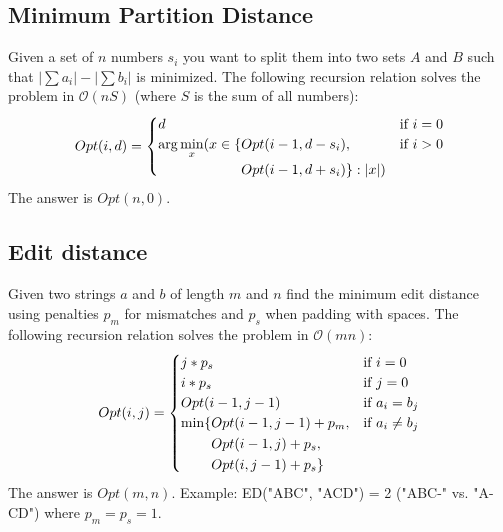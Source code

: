 \documentclass[8pt,a4paper,landscape,oneside]{amsart}
\newcommand{\bigO}{\mathcal{O}}
\begin{document}
\begin{multicols*}{3}
  \subsection{Minimum Partition Distance}
  Given a set of $n$ numbers $s_i$ you want to split them into two sets $A$ and $B$ such that $|\sum a_i| - |\sum b_i|$ is minimized. The following recursion relation solves the problem in $\bigO(nS)$ (where $S$ is the sum of all numbers):
  \[
  Opt(i,d) = \begin{cases}
  d & \text{if } i=0 \\
  \begin{aligned}[t]\arraycolsep=0pt
    \arg\min\limits_x(x \in \{ & Opt(i-1,d-s_i), \\ &
    Opt(i-1,d+s_i)\} : |x|)
  \end{aligned} & \text{if } i > 0 \\
  
  \end{cases}
  \]
  The answer is $Opt(n, 0)$.
  
  \subsection{Edit distance}
  Given two strings $a$ and $b$ of length $m$ and $n$ find the minimum edit distance using penalties $p_m$ for mismatches and $p_s$ when padding with spaces. The following recursion relation solves the problem in $\bigO(mn)$:
  \[
  Opt(i,j) = \begin{cases}
  j*p_s & \text{if } i=0 \\
  i*p_s & \text{if } j=0 \\
  Opt(i-1,j-1) & \text{if } a_i=b_j \\
  \begin{aligned}[t]\arraycolsep=0pt
    \min\lbrace &
      Opt(i-1,j-1) + p_m, \\ &
      Opt(i-1,j) + p_s, \\ & 
      Opt(i,j-1) + p_s \rbrace
  \end{aligned} & \text{if } a_i\neq b_j
  \end{cases}
  \]
  The answer is $Opt(m,n)$. Example: ED("ABC", "ACD") = 2 ("ABC-" vs. "A-CD") where $p_m = p_s = 1$.
  

\end{multicols*}
\end{document}
